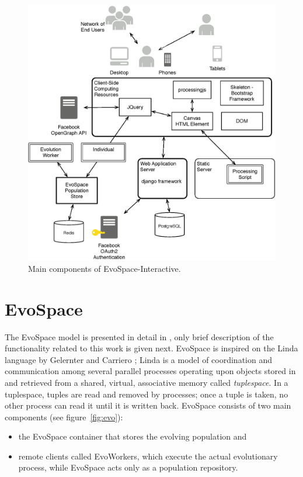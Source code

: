 \documentclass{sig-alternate}
\begin{document}
\begin{figure}[!t]
    \centering
        \includegraphics[width=4.5in]{Architecture.eps}
    \caption{Main components of EvoSpace-Interactive.}
    \label{fig:arch}
\end{figure}


\section{EvoSpace} %
The EvoSpace model is presented in detail in \cite{EvoSpace}, only
brief description of the functionality related to this work is given
next.  EvoSpace is inspired on the Linda language by Gelernter and
Carriero \cite{linda}; Linda is a model of coordination and
communication among several parallel processes operating upon objects
stored in and retrieved from a shared, virtual, associative memory
called {\em tuplespace}. In a tuplespace, tuples are read and removed by processes; once a tuple is taken, no other process can read it until it is written back. EvoSpace consists of two main components (see figure~\ref{fig:evo}):\begin{itemize}
\item the EvoSpace container
that stores the evolving population and
\item remote clients called
EvoWorkers, %
which execute the actual evolutionary process, while EvoSpace acts
only as a population repository. 
\end{itemize}
\end{document}
